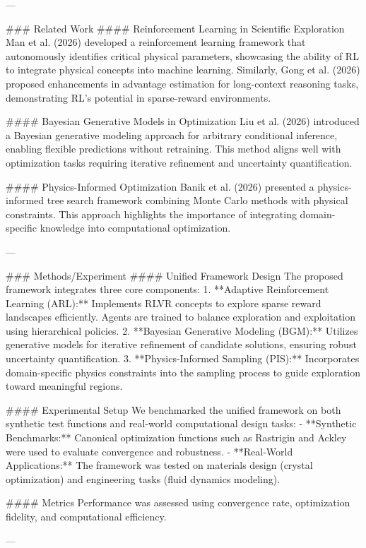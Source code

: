 ---

### Related Work  
#### Reinforcement Learning in Scientific Exploration  
Man et al. (2026) developed a reinforcement learning framework that autonomously identifies critical physical parameters, showcasing the ability of RL to integrate physical concepts into machine learning. Similarly, Gong et al. (2026) proposed enhancements in advantage estimation for long-context reasoning tasks, demonstrating RL's potential in sparse-reward environments.

#### Bayesian Generative Models in Optimization  
Liu et al. (2026) introduced a Bayesian generative modeling approach for arbitrary conditional inference, enabling flexible predictions without retraining. This method aligns well with optimization tasks requiring iterative refinement and uncertainty quantification.

#### Physics-Informed Optimization  
Banik et al. (2026) presented a physics-informed tree search framework combining Monte Carlo methods with physical constraints. This approach highlights the importance of integrating domain-specific knowledge into computational optimization.

---

### Methods/Experiment  
#### Unified Framework Design  
The proposed framework integrates three core components:  
1. **Adaptive Reinforcement Learning (ARL):** Implements RLVR concepts to explore sparse reward landscapes efficiently. Agents are trained to balance exploration and exploitation using hierarchical policies.  
2. **Bayesian Generative Modeling (BGM):** Utilizes generative models for iterative refinement of candidate solutions, ensuring robust uncertainty quantification.  
3. **Physics-Informed Sampling (PIS):** Incorporates domain-specific physics constraints into the sampling process to guide exploration toward meaningful regions.  

#### Experimental Setup  
We benchmarked the unified framework on both synthetic test functions and real-world computational design tasks:  
- **Synthetic Benchmarks:** Canonical optimization functions such as Rastrigin and Ackley were used to evaluate convergence and robustness.  
- **Real-World Applications:** The framework was tested on materials design (crystal optimization) and engineering tasks (fluid dynamics modeling).  

#### Metrics  
Performance was assessed using convergence rate, optimization fidelity, and computational efficiency.  

---

